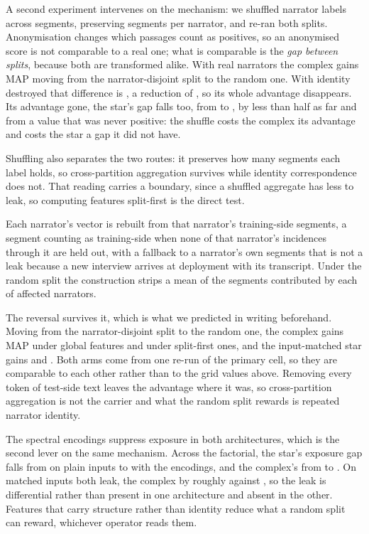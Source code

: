 \documentclass[conference]{IEEEtran}
\begin{document}
A second experiment intervenes on the mechanism: we shuffled narrator labels across segments,
preserving segments per narrator, and re-ran both splits. Anonymisation changes which
passages count as positives, so an anonymised score is not comparable to a real one; what is
comparable is the \emph{gap between splits}, because both are transformed alike. With real
narrators the complex gains \gapRealFive{} MAP moving from the narrator-disjoint split to the
random one. With identity destroyed that difference is \gapAnonFive{}, a reduction of
\gapReductionFive{}, so its whole advantage disappears. Its advantage gone, the star's gap
falls too, from
\gapRealThree{} to \gapAnonThree{}, by less than half as far and from a value that was never
positive: the shuffle costs the complex its advantage and costs the star a gap it did not
have.

Shuffling also separates the two routes: it preserves how many segments each label holds, so
cross-partition aggregation survives while identity correspondence does not. That reading
carries a boundary, since a shuffled aggregate has less to leak, so computing features
split-first is the direct test.

Each narrator's vector is rebuilt from that narrator's training-side
segments, a segment counting as training-side when none of that narrator's incidences through
it are held out, with a fallback to a narrator's own segments that is not a leak because a new
interview arrives at deployment with its transcript. Under the random split the
construction strips a mean \sfMeanRemoved{} of the segments contributed by each of
\sfNarrTouched{} affected narrators.

The reversal survives it, which is what we predicted in writing beforehand. Moving from the
narrator-disjoint split to the random one, the complex gains \sfLiftFiveGlobal{} MAP under
global features and \sfLiftFiveSF{} under split-first ones, and the input-matched star gains
\sfLiftThreeGlobal{} and \sfLiftThreeSF{}. Both arms come from one re-run of the primary
cell, so they are comparable to each other rather than to the grid values above.
Removing every token of test-side text leaves the
advantage where it was, so cross-partition aggregation is not the carrier and what the random
split rewards is repeated narrator identity.

The spectral encodings suppress exposure in both architectures, which is the second lever on
the same mechanism. Across the factorial, the star's exposure gap falls from
\facExpThreePlain{} on plain inputs to \facExpThreeEnc{} with the encodings, and the
complex's from \facExpFivePlain{} to \facExpFiveEnc{}. On matched inputs both leak, the
complex by roughly \facExpFivePlain{} against \facExpThreePlain{}, so the leak is
differential rather than present in one architecture and absent in the other. Features that
carry structure rather than identity reduce what a random split can reward, whichever operator
reads them.
\end{document}
